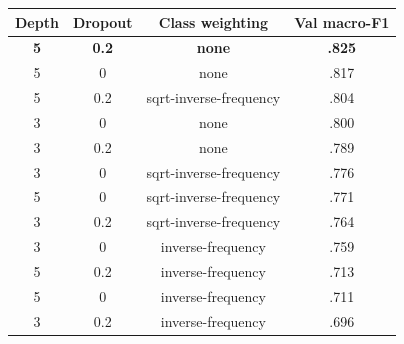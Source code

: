 \begin{center}
\label{tab:gnn-grid}
\footnotesize
\setlength{\tabcolsep}{4pt}
\renewcommand{\arraystretch}{0.95}
\begin{tabular}{@{}cccc@{}}
\toprule
Depth & Dropout & Class weighting & Val macro-F1 \\
\midrule
\textbf{5} & \textbf{0.2} & \textbf{none} & \textbf{.825} \\
5 & 0 & none & .817 \\
5 & 0.2 & sqrt-inverse-frequency & .804 \\
3 & 0 & none & .800 \\
3 & 0.2 & none & .789 \\
3 & 0 & sqrt-inverse-frequency & .776 \\
5 & 0 & sqrt-inverse-frequency & .771 \\
3 & 0.2 & sqrt-inverse-frequency & .764 \\
3 & 0 & inverse-frequency & .759 \\
5 & 0.2 & inverse-frequency & .713 \\
5 & 0 & inverse-frequency & .711 \\
3 & 0.2 & inverse-frequency & .696 \\
\bottomrule
\end{tabular}
\end{center}
